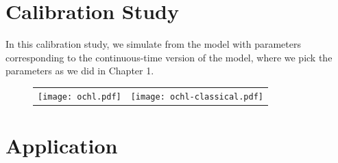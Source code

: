 \documentclass[10pt]{article}
\begin{document}
\section{Calibration Study}
In this calibration study, we simulate from the model with parameters
corresponding to the continuous-time version of the model, where we
pick the parameters as we did in Chapter 1.

\begin{figure}
  \begin{tabular}{cc}
    \begin{minipage}{0.45\textwidth}
      \centering
      \texttt{[image: ochl.pdf]}
    \end{minipage}
    & \begin{minipage}{0.45\textwidth}
      \centering
      \texttt{[image: ochl-classical.pdf]}
    \end{minipage}
  \end{tabular}
\end{figure}

\section{Application}



\end{document}
